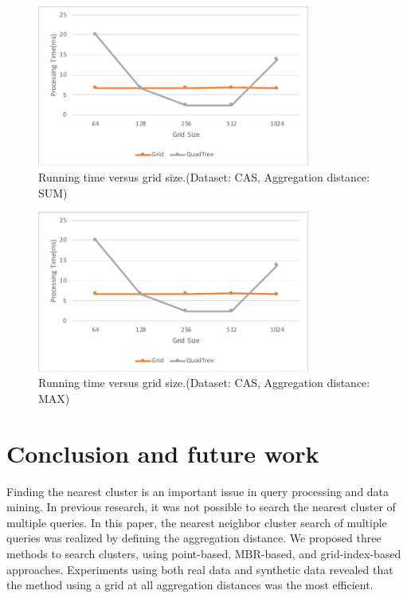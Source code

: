 \documentclass[a4paper,11pt]{report}
\theoremstyle{mytheoremstyle}
\begin{document}
\begin{figure}
    \begin{center}
        \includegraphics[width=0.8\textwidth]{src/images/CAS-SUM-GridSize.pdf}
    \end{center}
    \caption{Running time versus grid size.(Dataset: CAS, Aggregation distance: SUM)}
    \label{fig:sum-gridSize}
\end{figure}

\begin{figure}
    \begin{center}
        \includegraphics[width=0.8\textwidth]{src/images/CAS-SUM-GridSize.pdf}
    \end{center}
    \caption{Running time versus grid size.(Dataset: CAS, Aggregation distance: MAX)}
    \label{fig:max-gridSize}
\end{figure}

\chapter{Conclusion and future work}
\label{section:conclusion}

Finding the nearest cluster is an important issue in query processing and data mining. In previous research, it was not possible to search the nearest cluster of multiple queries. In this paper, the nearest neighbor cluster search of multiple queries was realized by defining the aggregation distance. We proposed three methods to search clusters, using point-based, MBR-based, and grid-index-based approaches. Experiments using both real data and synthetic data revealed that the method using a grid at all aggregation distances was the most efficient.
\end{document}
